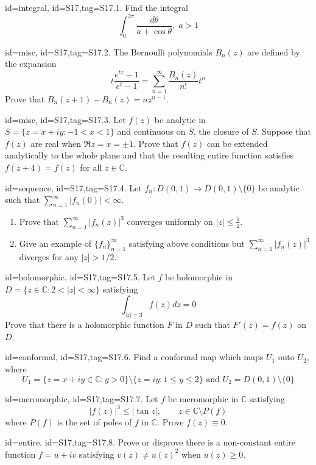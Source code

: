 \documentclass[12pt,letterpaper]{article}
\theoremstyle{plain}
\theoremstyle{definition}
\begin{document}
{\item[id=integral, id=S17,tag=S17.1.]
Find the integral
\[
	\int_{0}^{2\pi} \frac{d\theta}{a + \cos \theta}, \; a > 1
\]
\item[id=misc, id=S17,tag=S17.2.]
The Bernoulli polynomials $B_n(z)$ are defined by the expansion
\[
	t \frac{e^{tz} - 1}{e^t -1} = \sum_{n=1}^{\infty} \frac{B_n(z)}{n!} t^{n}
\]
Prove that $B_n(z+1) - B_n(z) = nz^{n-1}$.
\item[id=misc, id=S17,tag=S17.3.]
Let $f(z)$ be analytic in $S = \{z = x + iy \colon -1 < x < 1\}$ and continuous on $\overline{S}$, the closure of $S$. Suppose that $f(z)$ are real when $\Re z = x = \pm 1$. Prove that $f(z)$ can be extended analytically to the whole plane and that the resulting entire function satisfies $f(z+4) = f(z)$ for all $z \in \mathbb{C}$.
\item[id=sequence, id=S17,tag=S17.4.]
Let $f_n : D(0,1) \rightarrow D(0,1) \setminus \{0\}$ be analytic such that $\sum_{n=1}^{\infty} | f_n(0) | < \infty$.
\begin{enumerate}[label=(\alph*)]\onlyitems
\item Prove that $\sum_{n=1}^{\infty} | f_n(z) |^3$ converges uniformly on $| z | \le \frac{1}{2}$.
\item Give an example of $\{f_n\}_{n=1}^{\infty}$ satisfying above conditions but $\sum_{n=1}^{\infty} | f_n(z) |^3$ diverges for any $| z | > 1/2$.
\end{enumerate}
\item[id=holomorphic, id=S17,tag=S17.5.]
Let $f$ be holomorphic in $D = \{z \in \mathbb{C} \colon 2 < | z | < \infty\}$ satisfying
\[
 	\int_{| z | = 3} f(z) dz = 0
 \] 
 Prove that there is a holomorphic function $F$ in $D$ such that $F'(z) = f(z)$ on $D$.
\item[id=conformal, id=S17,tag=S17.6.]
Find a conformal map which maps $U_1$ onto $U_2$, where
\[
	U_1 = \{z = x + iy \in \mathbb{C} \colon y > 0\} \setminus \{z = iy \colon 1 \le y \le 2\} \text{ and } U_2 = D(0,1) \setminus \{0\}
\]
\item[id=meromorphic, id=S17,tag=S17.7.]
Let $f$ be meromorphic in $\mathbb{C}$ satisfying
\[
	| f(z) |^3 \le | \tan z |, \qquad z \in \mathbb{C} \setminus P(f)
\]
where $P(f)$ is the set of poles of $f$ in $\mathbb{C}$. Prove $f(z) \equiv 0$.
\item[id=entire, id=S17,tag=S17.8.]
Prove or disprove there is a non-constant entire function $f = u+ iv$ satisfying $v(z) \ne u(z)^2$ when $u(z) \ge 0$.

}
\end{document}
